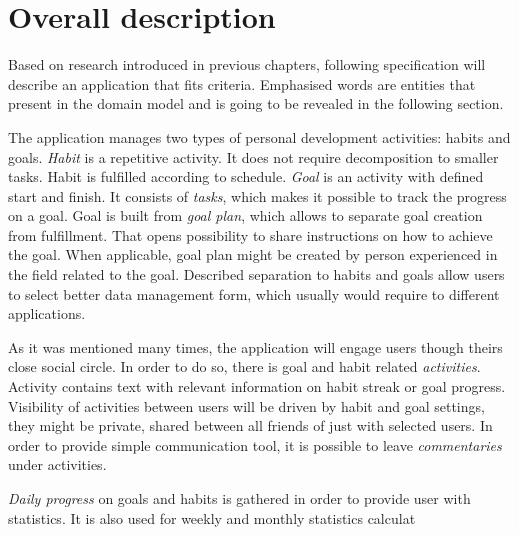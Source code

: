 
\section{Overall description}\label{sec:overall-description}

Based on research introduced in previous chapters, following specification will describe an application that fits criteria.
Emphasised words are entities that present in the domain model and is going to be revealed in the following section.

The application manages two types of personal development activities: habits and goals.
\textit{Habit} is a repetitive activity.
It does not require decomposition to smaller tasks.
Habit is fulfilled according to schedule.
\textit{Goal} is an activity with defined start and finish.
It consists of \textit{tasks}, which makes it possible to track the progress on a goal.
Goal is built from \textit{goal plan}, which allows to separate goal creation from fulfillment.
That opens possibility to share instructions on how to achieve the goal.
When applicable, goal plan might be created by person experienced in the field related to the goal.
Described separation to habits and goals allow users to select better data management form, which usually would require to different applications.

As it was mentioned many times, the application will engage users though theirs close social circle.
In order to do so, there is goal and habit related \textit{activities}.
Activity contains text with relevant information on habit streak or goal progress.
Visibility of activities between users will be driven by habit and goal settings, they might be private, shared between all friends of just with selected users.
In order to provide simple communication tool, it is possible to leave \textit{commentaries} under activities.

\textit{Daily progress} on goals and habits is gathered in order to provide user with statistics.
It is also used for weekly and monthly statistics calculat